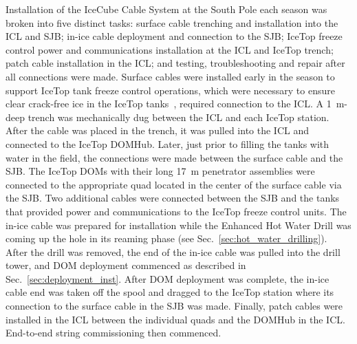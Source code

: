 Installation of the IceCube Cable System at the South Pole each season was
broken into five distinct tasks: surface cable trenching and
installation into the ICL and SJB; in-ice cable deployment and
connection to the SJB; IceTop freeze control power and communications installation at the ICL and
IceTop trench; patch cable installation in the ICL; and testing,
troubleshooting and repair after all connections were made. Surface cables
were installed early in the season to support IceTop tank freeze control
operations, which were necessary to ensure clear crack-free ice in the
IceTop tanks~\cite{ICECUBE:IceTop},
required connection to the ICL. A 1~m-deep trench was mechanically
dug between the ICL and each IceTop station. After the cable was placed in
the trench, it was pulled into the ICL and connected to the IceTop
DOMHub. Later, just prior to filling the tanks with water in the field, the
connections were made between the surface cable and the SJB. The IceTop
DOMs with their long 17~m penetrator assemblies were connected to the
appropriate quad located in the center of the surface cable via the SJB. Two additional
cables were connected between the SJB and the tanks that provided power and
communications to the IceTop freeze control units. The in-ice cable
was prepared for installation while the Enhanced Hot Water Drill was coming
up the hole in its reaming phase (see
Sec.~\ref{sec:hot_water_drilling}).  After the drill was removed,
the end of the in-ice cable was pulled into the drill tower, and DOM deployment
commenced as described in Sec.~\ref{sec:deployment_inst}. After DOM
deployment was complete, the in-ice cable end was taken off the spool and
dragged to the IceTop station where its connection to the surface cable in the SJB was
made. Finally, patch cables were installed in the ICL between the
individual quads and the DOMHub in the ICL. End-to-end string commissioning
then commenced.
